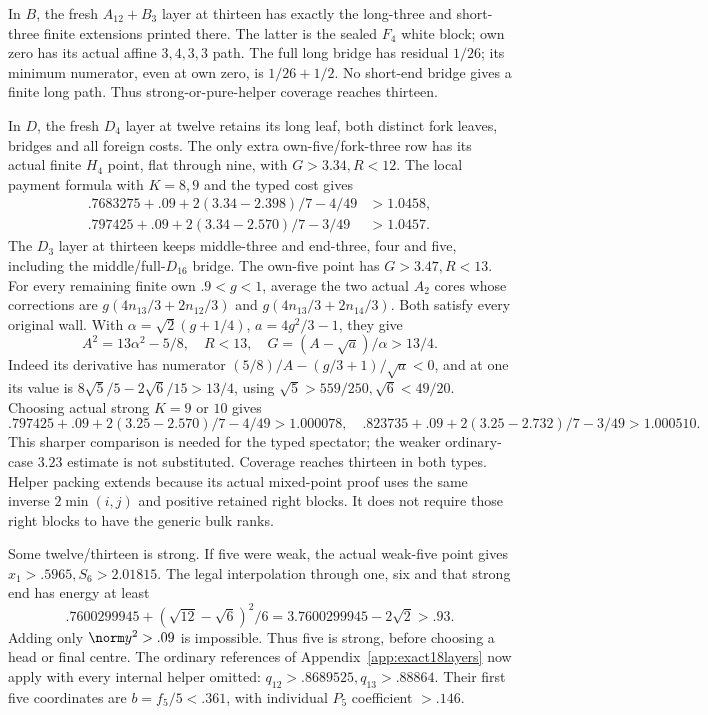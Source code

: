 In \(B\), the fresh \(A_{12}+B_3\) layer at thirteen has
exactly the long-three and short-three finite extensions printed
there. The latter is the sealed \(F_4\) white block; own zero
has its actual affine \(3,4,3,3\) path. The full long bridge
has residual \(1/26\); its minimum numerator, even at own zero,
is \(1/26+1/2\). No short-end bridge gives a finite long path.
Thus strong-or-pure-helper coverage reaches thirteen.

In \(D\), the fresh \(D_4\) layer at twelve retains its long
leaf, both distinct fork leaves, bridges and all foreign costs.
The only extra own-five/fork-three row has its actual finite
\(H_4\) point, flat through nine, with \(G>3.34,R<12\).
The local payment formula with \(K=8,9\) and the typed cost gives
\[
\begin{split}
 .7683275+.09+2(3.34-2.398)/7-4/49&>1.0458,\\
 .797425+.09+2(3.34-2.570)/7-3/49&>1.0457.
\end{split}
\]
The \(D_3\) layer at thirteen keeps middle-three and end-three,
four and five, including the middle/full-\(D_{16}\) bridge.
The own-five point has \(G>3.47,R<13\). For every remaining
finite own \(.9<g<1\), average the two actual \(A_2\) cores
whose corrections are \(g(4n_{13}/3+2n_{12}/3)\) and
\(g(4n_{13}/3+2n_{14}/3)\). Both satisfy every original wall.
With \(\alpha=\sqrt2(g+1/4)\), \(a=4g^2/3-1\), they give
\[
 A^2=13\alpha^2-5/8,\quad R<13,\quad
 G=(A-\sqrt a)/\alpha>13/4.
\]
Indeed its derivative has numerator
\((5/8)/A-(g/3+1)/\sqrt a<0\), and at one its value is
\(8\sqrt5/5-2\sqrt6/15>13/4\), using
\(\sqrt5>559/250,\sqrt6<49/20\).
Choosing actual strong \(K=9\) or \(10\) gives
\[
 .797425+.09+2(3.25-2.570)/7-4/49>1.000078,
\quad .823735+.09+2(3.25-2.732)/7-3/49>1.000510.
\]
This sharper comparison is needed for the typed spectator; the weaker
ordinary-case \(3.23\) estimate is not substituted. Coverage reaches
thirteen in both types. Helper packing extends because its actual
mixed-point proof uses the same inverse \(2\min(i,j)\) and positive
retained right blocks. It does not require those right blocks to have
the generic bulk ranks.

Some twelve/thirteen is strong. If five were weak, the actual
weak-five point gives \(x_1>.5965,S_6>2.01815\). The legal
interpolation through one, six and that strong end has energy at least
\[
 .7600299945+(\sqrt{12}-\sqrt6)^2/6
             =3.7600299945-2\sqrt2>.93.
\]
Adding only \(\norm y^2>.09\) is impossible. Thus five is strong,
before choosing a head or final centre. The ordinary references of
Appendix~\ref{app:exact18layers} now apply with every internal helper
omitted: \(q_{12}>.8689525,q_{13}>.88864\). Their first five
coordinates are \(b=f_5/5<.361\), with individual \(P_5\)
coefficient \(>.146\).

